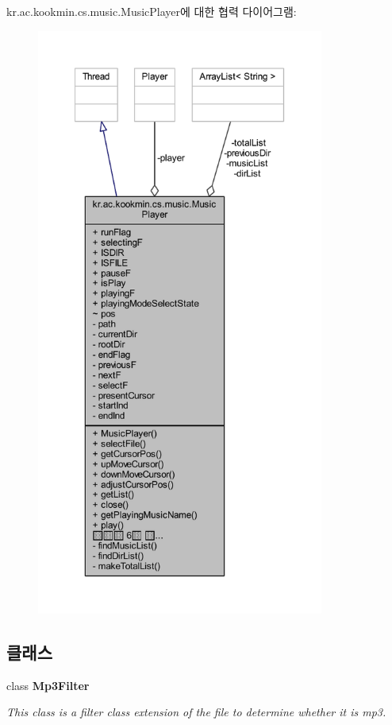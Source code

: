 kr.\+ac.\+kookmin.\+cs.\+music.\+Music\+Player에 대한 협력 다이어그램\+:\nopagebreak
\begin{figure}[H]
\begin{center}
\leavevmode
\includegraphics[height=550pt]{classkr_1_1ac_1_1kookmin_1_1cs_1_1music_1_1_music_player__coll__graph}
\end{center}
\end{figure}
\subsection*{클래스}
\begin{DoxyCompactItemize}
\item 
class {\bfseries Mp3\+Filter}
\begin{DoxyCompactList}\small\item\em This class is a filter class extension of the file to determine whether it is mp3. \end{DoxyCompactList}\end{DoxyCompactItemize}
